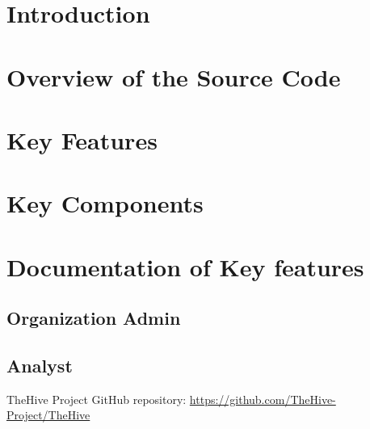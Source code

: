 \documentclass{article}
\begin{document}
\tableofcontents
\newpage



\section{Introduction}


\section{Overview of the Source Code}


\section{Key Features}


\section{Key Components}


\section{Documentation of Key features}
\subsection{Organization Admin}

\newpage
\subsection{Analyst}


\newpage
\begin{thebibliography}{9}
 TheHive Project GitHub repository: \url{https://github.com/TheHive-Project/TheHive}
\end{thebibliography}
\end{document}
